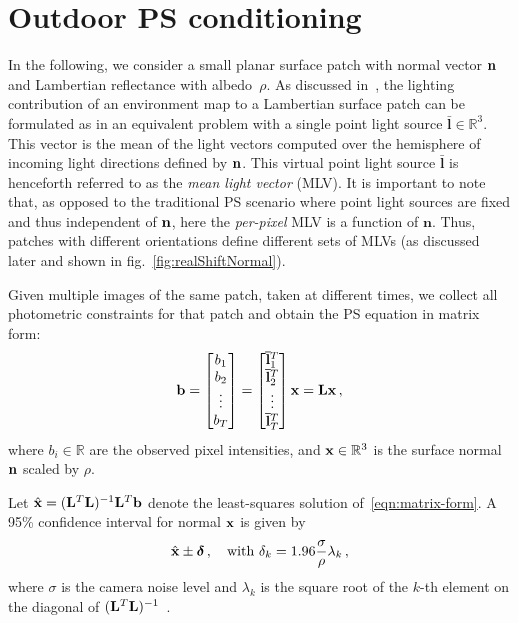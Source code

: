 

\section{Outdoor PS conditioning}
\label{sec:sensitivity-analysis}

In the following, we consider a small planar surface patch with normal vector ${\bf n}$ and Lambertian reflectance with albedo~$\rho$. As discussed in~\cite{holdgeoffroy-iccp-15,hung-wacv-15}, the lighting contribution of an environment map to a Lambertian surface patch can be formulated as in an equivalent problem with a single point light source $\bar{\mathbf{l}} \in \mathbb{R}^3$. This vector is the mean of the light vectors computed over the hemisphere of incoming light directions defined by ${\bf n}$. This virtual point light source $\bar{\mathbf{l}}$ is henceforth referred to as the {\em mean light vector} (MLV). It is important to note that, as opposed to the traditional PS scenario where point light sources are fixed and thus independent of ${\bf n}$, here the {\em per-pixel} MLV is a function of $\mathbf{n}$. Thus, patches with different orientations define different sets of MLVs (as discussed later and shown in fig.~\ref{fig:realShiftNormal}).

Given multiple images of the same patch, taken at different times, we collect all photometric constraints for that patch and obtain the PS equation in matrix form:
%
\begin{equation}
\mathbf{b} =
\begin{bmatrix}
 b_1 \\ b_2 \\ \vdots \\ b_T
\end{bmatrix}
= 
\begin{bmatrix}
 {\bf \bar l}_1^T \\ {\bf \bar l}_2^T \\ \vdots \\ {\bf \bar l}_T^T
\end{bmatrix}
{\bf x} = \mathbf{L} \mathbf{x} \,,
\label{eqn:matrix-form}
\end{equation}
%
where $b_i \in \mathbb{R}$ are the observed pixel intensities, and ${\bf x} \in \mathbb{R}^3$ is the surface normal ${\bf n}$ scaled by $\rho$.

Let $\hat{{\bf x}}=({\bf L}^T{\bf L})^{-1}{\bf L}^T{\bf b}$ denote the least-squares solution of~\eqref{eqn:matrix-form}. A 95\% confidence interval for normal ${\bf x}$ is given by 
%
\begin{equation}
\hat{\mathbf{x}} \pm \boldsymbol \delta \,, \quad \text{with } \delta_k = 1.96 \frac{\sigma}{\rho}\lambda_k \,,
\label{eqn:confidence-xyz}
\end{equation}
%
where $\sigma$ is the camera noise level and $\lambda_k$ is the square root of the $k$-th element on the diagonal of $({\bf L}^T{\bf L})^{-1}$~\cite{hastie-book-09}. 

